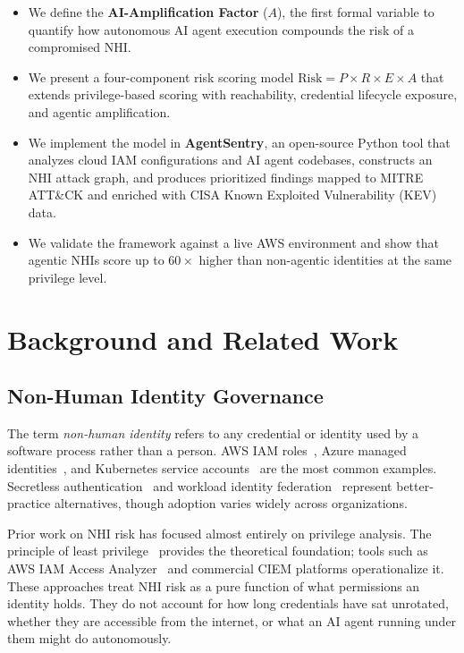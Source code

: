 \documentclass[conference]{IEEEtran}
\begin{document}
\begin{itemize}
  \item We define the \textbf{AI-Amplification Factor} ($A$), the first formal
        variable to quantify how autonomous AI agent execution compounds the risk
        of a compromised NHI.
  \item We present a four-component risk scoring model
        $\text{Risk} = P \times R \times E \times A$ that extends privilege-based
        scoring with reachability, credential lifecycle exposure, and agentic
        amplification.
  \item We implement the model in \textbf{AgentSentry}, an open-source Python
        tool that analyzes cloud IAM configurations and AI agent codebases,
        constructs an NHI attack graph, and produces prioritized findings mapped
        to MITRE ATT\&CK and enriched with CISA Known Exploited Vulnerability
        (KEV) data.
  \item We validate the framework against a live AWS environment and show that
        agentic NHIs score up to $60\times$ higher than non-agentic identities
        at the same privilege level.
\end{itemize}

\section{Background and Related Work}

\subsection{Non-Human Identity Governance}

The term \emph{non-human identity} refers to any credential or identity used by
a software process rather than a person. AWS IAM roles~\cite{aws_iam2024},
Azure managed identities~\cite{azure_identity2024}, and Kubernetes service
accounts~\cite{k8s_sa2024} are the most common examples. Secretless
authentication~\cite{conjur2022} and workload identity
federation~\cite{workload_identity2023} represent better-practice alternatives,
though adoption varies widely across organizations.

Prior work on NHI risk has focused almost entirely on privilege analysis. The
principle of least privilege~\cite{saltzer1975} provides the theoretical
foundation; tools such as AWS IAM Access Analyzer~\cite{access_analyzer} and
commercial CIEM platforms operationalize it. These approaches treat NHI risk as
a pure function of what permissions an identity holds. They do not account for
how long credentials have sat unrotated, whether they are accessible from the
internet, or what an AI agent running under them might do autonomously.
\end{document}
